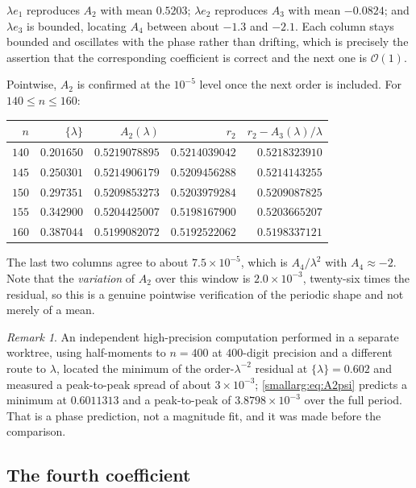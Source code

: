 \documentclass[11pt,oneside]{article}
\theoremstyle{definition}
\theoremstyle{remark}
\newtheorem{remark}[theorem]{Remark}
\newcommand{\bigO}{\mathcal O}
\begin{document}
$\lambda e_1$ reproduces $A_2$ with mean $0.5203$; $\lambda e_2$ reproduces
$A_3$ with mean $-0.0824$; and $\lambda e_3$ is bounded, locating $A_4$ between
about $-1.3$ and $-2.1$.  Each column stays bounded and oscillates with the
phase rather than drifting, which is precisely the assertion that the
corresponding coefficient is correct and the next one is $\bigO(1)$.

Pointwise, $A_2$ is confirmed at the $10^{-5}$ level once the next order is
included.  For $140\le n\le160$:

\begin{center}\small
\begin{tabular}{@{}rrrrr@{}}
\toprule
$n$ & $\{\lambda\}$ & $A_2(\lambda)$ & $r_2$ & $r_2-A_3(\lambda)/\lambda$\\
\midrule
$140$ & $0.201650$ & $0.5219078895$ & $0.5214039042$ & $0.5218323910$\\
$145$ & $0.250301$ & $0.5214906179$ & $0.5209456288$ & $0.5214143255$\\
$150$ & $0.297351$ & $0.5209853273$ & $0.5203979284$ & $0.5209087825$\\
$155$ & $0.342900$ & $0.5204425007$ & $0.5198167900$ & $0.5203665207$\\
$160$ & $0.387044$ & $0.5199082072$ & $0.5192522062$ & $0.5198337121$\\
\bottomrule
\end{tabular}
\end{center}

The last two columns agree to about $7.5\times10^{-5}$, which is
$A_4/\lambda^2$ with $A_4\approx-2$.  Note that the \emph{variation} of $A_2$
over this window is $2.0\times10^{-3}$, twenty-six times the residual, so this
is a genuine pointwise verification of the periodic shape and not merely of a
mean.

\begin{remark}
An independent high-precision computation performed in a separate worktree,
using half-moments to $n=400$ at $400$-digit precision and a different route to
$\lambda$, located the minimum of the order-$\lambda^{-2}$ residual at
$\{\lambda\}=0.602$ and measured a peak-to-peak spread of about
$3\times10^{-3}$; \cref{smallarg:eq:A2psi} predicts a minimum at $0.6011313$ and a
peak-to-peak of $3.8798\times10^{-3}$ over the full period.  That is a phase
prediction, not a magnitude fit, and it was made before the comparison.
\end{remark}

\subsection{The fourth coefficient}
\end{document}
